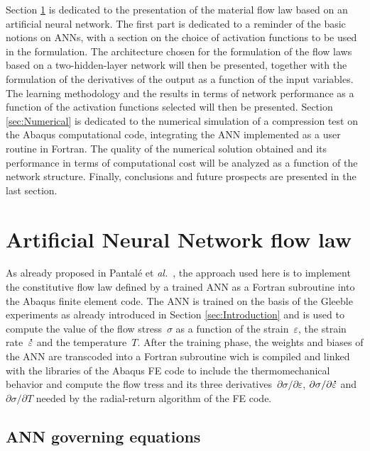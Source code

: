 \documentclass[algorithms,article,submit,pdftex,oneauthors]{Definitions/mdpi}
\makeatletter
\DeclareRobustCommand{\mdot}[1]{\accentset{\mbox{\bfseries .}}{#1}}
\DeclareRobustCommand{\eal}{et \emph{al.}\@\xspace}
\makeatother
\begin{document}
Section \ref{sec:ANN} is dedicated to the presentation of the material flow law based on an artificial neural network.
The first part is dedicated to a reminder of the basic notions on ANNs, with a section on the choice of activation functions to be used in the formulation.
The architecture chosen for the formulation of the flow laws based on a two-hidden-layer network will then be presented, together with the formulation of the derivatives of the output as a function of the input variables.
The learning methodology and the results in terms of network performance as a function of the activation functions selected will then be presented.
Section \ref{sec:Numerical} is dedicated to the numerical simulation of a compression test on the Abaqus computational code, integrating the ANN implemented as a user routine in Fortran.
The quality of the numerical solution obtained and its performance in terms of computational cost will be analyzed as a function of the network structure.
Finally, conclusions and future prospects are presented in the last section.

\section{Artificial Neural Network flow law}\label{sec:ANN}

As already proposed in Pantalé \eal~\cite{Pantale-2021-EIN, Pantale-2023-DIA}, the approach used here is to implement the constitutive flow law defined by a trained ANN as a Fortran subroutine into the Abaqus finite element code.
The ANN is trained on the basis of the Gleeble experiments as already introduced in Section \ref{sec:Introduction} and is used to compute the value of the flow stress~$\sigma$ as a function of the strain~$\varepsilon$, the strain rate~$\mdot{\varepsilon}$ and the temperature~$T$.
After the training phase, the weights and biases of the ANN are transcoded into a Fortran subroutine wich is compiled and linked with the libraries of the Abaqus FE code to include the thermomechanical behavior and compute the flow tress and its three derivatives~$\partial\sigma/\partial\varepsilon$, $\partial\sigma/\partial\mdot{\varepsilon}$ and~$\partial\sigma/\partial T$ needed by the radial-return algorithm of the FE code.

\subsection{ANN governing equations}\label{subsec:ANN-eqn}
\end{document}
